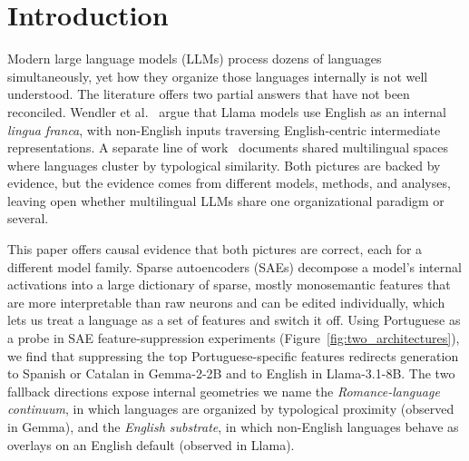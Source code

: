 \documentclass[runningheads]{llncs}
\begin{document}
\section{Introduction}
\label{sec:intro}

Modern large language models (LLMs) process dozens of languages simultaneously, yet how they organize those languages internally is not well understood. The literature offers two partial answers that have not been reconciled. Wendler et al.~\cite{wendler2024llamas} argue that Llama models use English as an internal \emph{lingua franca}, with non-English inputs traversing English-centric intermediate representations. A separate line of work~\cite{kojima2024multilingual} documents shared multilingual spaces where languages cluster by typological similarity. Both pictures are backed by evidence, but the evidence comes from different models, methods, and analyses, leaving open whether multilingual LLMs share one organizational paradigm or several.

This paper offers causal evidence that both pictures are correct, each for a different model family. Sparse autoencoders (SAEs) decompose a model's internal activations into a large dictionary of sparse, mostly monosemantic features that are more interpretable than raw neurons and can be edited individually, which lets us treat a language as a set of features and switch it off. Using Portuguese as a probe in SAE feature-suppression experiments (Figure~\ref{fig:two_architectures}), we find that suppressing the top Portuguese-specific features redirects generation to Spanish or Catalan in Gemma-2-2B and to English in Llama-3.1-8B. The two fallback directions expose internal geometries we name the \emph{Romance-language continuum}, in which languages are organized by typological proximity (observed in Gemma), and the \emph{English substrate}, in which non-English languages behave as overlays on an English default (observed in Llama).
\end{document}
